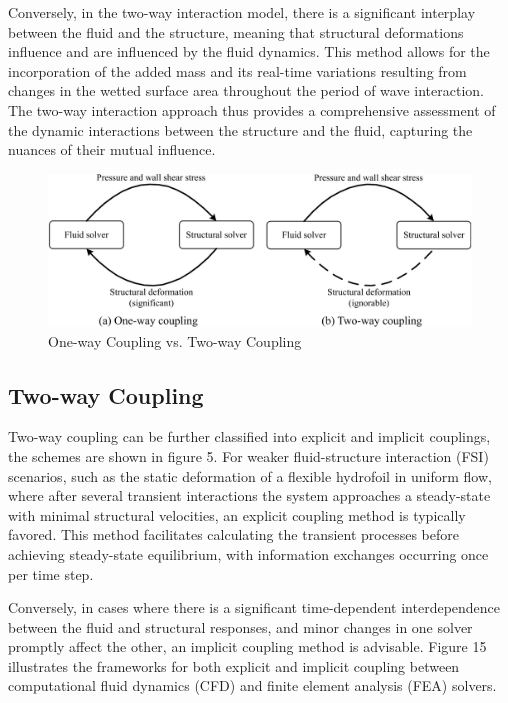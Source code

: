 \documentclass[12pt]{article} %
\begin{document}
Conversely, in the two-way interaction model, there is a significant interplay between the fluid and the structure, meaning that structural deformations influence 
and are influenced by the fluid dynamics. This method allows for the incorporation of the added mass and its real-time variations resulting from changes in the 
wetted surface area throughout the period of wave interaction. The two-way interaction approach thus provides a comprehensive assessment of the dynamic interactions 
between the structure and the fluid, capturing the nuances of their mutual influence.
\begin{figure}[ht]
    \centering
    \includegraphics[width=1\textwidth]{OT.png}
    \caption{One-way Coupling vs. Two-way Coupling}
\end{figure}

\subsection{Two-way Coupling}
Two-way coupling can be further classified into explicit and implicit couplings, the schemes are shown in figure 5. For weaker fluid-structure interaction (FSI) scenarios, 
such as the static deformation of a flexible hydrofoil in uniform flow, where after several transient interactions the system approaches a 
steady-state with minimal structural velocities, an explicit coupling method is typically favored. This method facilitates calculating the 
transient processes before achieving steady-state equilibrium, with information exchanges occurring once per time step.

Conversely, in cases where there is a significant time-dependent interdependence between the fluid and structural responses, and minor 
changes in one solver promptly affect the other, an implicit coupling method is advisable. Figure 15 illustrates the frameworks for both 
explicit and implicit coupling between computational fluid dynamics (CFD) and finite element analysis (FEA) solvers.
\end{document}
